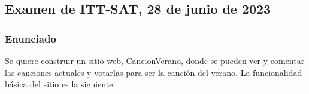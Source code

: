\subsection{Examen de ITT-SAT, 28 de junio de 2023}

\subsubsection{Enunciado}

Se quiere construir un sitio web, CancionVerano, donde se pueden ver y comentar las canciones actuales y votarlas para ser la canción del verano. La funcionalidad básica del sitio es la siguiente:

